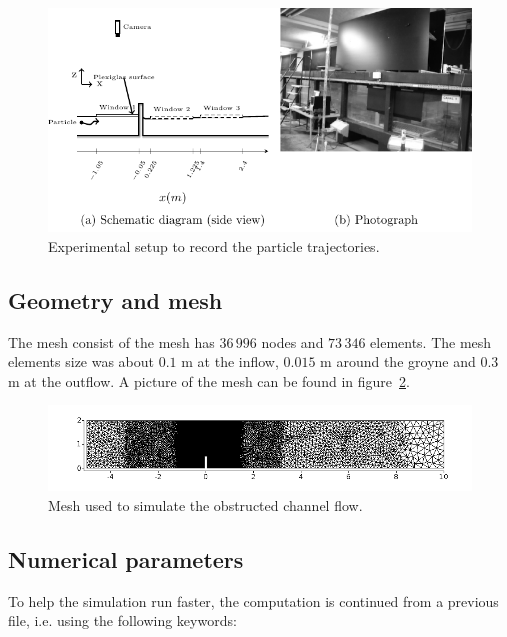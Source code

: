 \begin{figure}[H]%
\begin{center}
%
  \includegraphics[]{./Figures/CanalAlgExpSetup2}
%
\end{center}
\caption{Experimental setup to record the particle trajectories.}
\label{fig:exp_setup2}
\end{figure}



%
%
\subsection{Geometry and mesh}

The mesh consist of the mesh has $36\,996$ nodes and $73\,346$ elements.
The mesh elements size was about $0.1$ m at the inflow, $0.015$ m around the groyne and $0.3$ m at the
outflow. A picture of the mesh can be found in figure~\ref{fig:mesh_obstruc_channel}.

\begin{figure}[H]%
\begin{center}
%
  \includegraphics[width=0.85\linewidth]{./Figures/Images/mesh_obstruc_channel}
%
\end{center}
\caption{Mesh used to simulate the obstructed channel flow.}
\label{fig:mesh_obstruc_channel}
\end{figure}

\subsection{Numerical parameters}
To help the simulation run faster, the computation is continued from a previous file, i.e. using the
following keywords:


